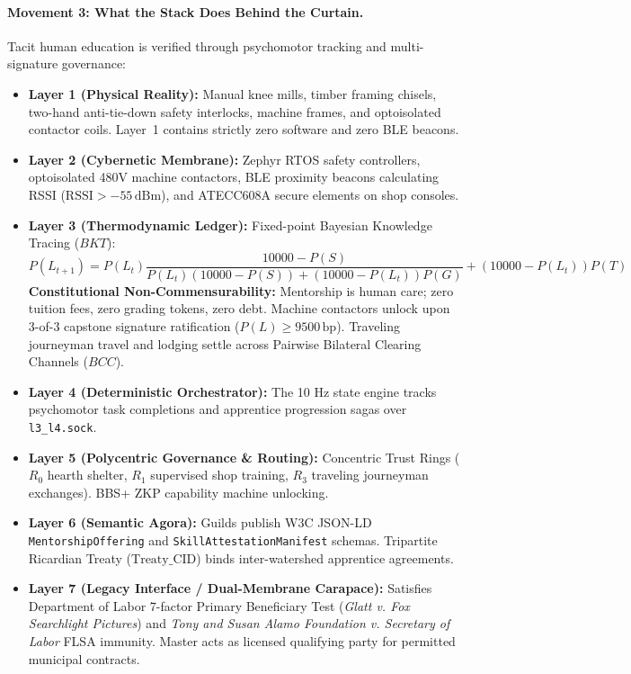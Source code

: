 \paragraph{Movement 3: What the Stack Does Behind the Curtain.}
Tacit human education is verified through psychomotor tracking and multi-signature governance:
\begin{itemize}
    \item \textbf{Layer 1 (Physical Reality):} Manual knee mills, timber framing chisels, two-hand anti-tie-down safety interlocks, machine frames, and optoisolated contactor coils. Layer~1 contains strictly zero software and zero BLE beacons.
    \item \textbf{Layer 2 (Cybernetic Membrane):} Zephyr RTOS safety controllers, optoisolated 480V machine contactors, BLE proximity beacons calculating RSSI ($\mathrm{RSSI} > -55\,\mathrm{dBm}$), and ATECC608A secure elements on shop consoles.
    \item \textbf{Layer 3 (Thermodynamic Ledger):} Fixed-point Bayesian Knowledge Tracing ($BKT$):
    \[
    P(L_{t+1}) = P(L_t) \frac{10000 - P(S)}{P(L_t)(10000 - P(S)) + (10000 - P(L_t)) P(G)} + (10000 - P(L_t)) P(T)
    \]
    \textbf{Constitutional Non-Commensurability:} Mentorship is human care; zero tuition fees, zero grading tokens, zero debt. Machine contactors unlock upon 3-of-3 capstone signature ratification ($P(L) \ge 9500\,\mathrm{bp}$). Traveling journeyman travel and lodging settle across Pairwise Bilateral Clearing Channels ($BCC$).
    \item \textbf{Layer 4 (Deterministic Orchestrator):} The 10 Hz state engine tracks psychomotor task completions and apprentice progression sagas over \texttt{l3\_l4.sock}.
    \item \textbf{Layer 5 (Polycentric Governance \& Routing):} Concentric Trust Rings ($R_0$ hearth shelter, $R_1$ supervised shop training, $R_3$ traveling journeyman exchanges). BBS+ ZKP capability machine unlocking.
    \item \textbf{Layer 6 (Semantic Agora):} Guilds publish W3C JSON-LD \texttt{MentorshipOffering} and \texttt{SkillAttestationManifest} schemas. Tripartite Ricardian Treaty ($\mathrm{Treaty\_CID}$) binds inter-watershed apprentice agreements.
    \item \textbf{Layer 7 (Legacy Interface / Dual-Membrane Carapace):} Satisfies Department of Labor 7-factor Primary Beneficiary Test (\textit{Glatt v. Fox Searchlight Pictures}) and \textit{Tony and Susan Alamo Foundation v. Secretary of Labor} FLSA immunity. Master acts as licensed qualifying party for permitted municipal contracts.
\end{itemize}

